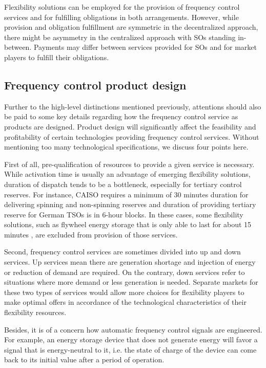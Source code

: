 Flexibility solutions can be employed for the provision of frequency control services and for fulfilling obligations in both arrangements. However, while provision and obligation fulfillment are symmetric in the decentralized approach, there might be asymmetry in the centralized approach with SOs standing in-between. Payments may differ between services provided for SOs and for market players to fulfill their obligations.

\subsection{Frequency control product design}
Further to the high-level distinctions mentioned previously, attentions should also be paid to some key details regarding how the frequency control service as products are designed. Product design will significantly affect the feasibility and profitability of certain technologies providing frequency control services. Without mentioning too many technological specifications, we discuss four points here. 

First of all, pre-qualification of resources to provide a given service is necessary. While activation time is usually an advantage of emerging flexibility solutions, duration of dispatch tends to be a bottleneck, especially for tertiary control reserves. For instance, CAISO requires a minimum of 30 minutes duration for delivering spinning and non-spinning reserves and duration of providing tertiary reserve for German TSOs is in 6-hour blocks. In these cases, some flexibility solutions, such as flywheel energy storage that is only able to last for about 15 minutes \cite{EllisonJ.F.TesfatsionL.S.LooseV.W.Byrne2012,Beaudin2014}, are excluded from provision of those services.

Second, frequency control services are sometimes divided into up and down services. Up services mean there are generation shortage and injection of energy or reduction of demand are required. On the contrary, down services refer to situations where more demand or less generation is needed. Separate markets for these two types of services would allow more choices for flexibility players to make optimal offers in accordance of the technological characteristics of their flexibility resources.

Besides, it is of a concern how automatic frequency control signals are engineered. For example, an energy storage device that does not generate energy will favor a signal that is energy-neutral to it, i.e. the state of charge of the device can come back to its initial value after a period of operation.

